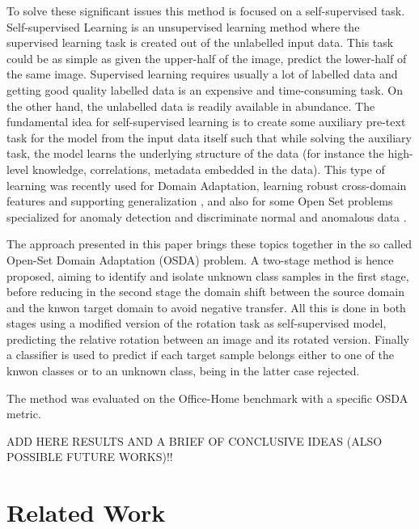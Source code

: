 \documentclass[10pt,twocolumn,letterpaper]{article}
\begin{document}
To solve these significant issues this method is focused on a self-supervised task. 
Self-supervised Learning is an unsupervised learning method where the supervised learning 
task is created out of the unlabelled input data. This task could be as simple as given 
the upper-half of the image, predict the lower-half of the same image.
Supervised learning requires usually a lot of labelled data and getting good quality labelled 
data is an expensive and time-consuming task. On the other hand, the unlabelled data is readily
available in abundance.
The fundamental idea for self-supervised learning is to create some auxiliary pre-text task
for the model from the input data itself such that while solving the auxiliary task,
the model learns the underlying structure of the data (for instance the high-level knowledge, correlations,
metadata embedded in the data).
This type of learning was recently used for Domain Adaptation, learning robust cross-domain features
and supporting generalization \cite{CarlucciJigsaw,SelfSupervisedXu}, and also for some Open Set problems specialized for anomaly detection
and discriminate normal and anomalous data \cite{bergman2020classificationbased,dectionGeometric}.

The approach presented in this paper brings these topics together in the so called Open-Set Domain 
Adaptation (OSDA) problem. A two-stage method is hence proposed, aiming to identify and isolate unknown
class samples in the first stage, before reducing in the second stage the domain shift between the source 
domain and the knwon target domain to avoid negative transfer.
All this is done in both stages using a modified version of the rotation task as self-supervised model,
predicting the relative rotation between an image and its rotated version.
Finally a classifier is used to predict if each target sample belongs either to one of the knwon classes
or to an unknown class, being in the latter case rejected.

The method was evaluated on the Office-Home benchmark \cite{venkateswara2017deep} with a specific OSDA metric.

ADD HERE RESULTS AND A BRIEF OF CONCLUSIVE IDEAS (ALSO POSSIBLE FUTURE WORKS)!!

\section{Related Work}
\label{sec:relatedwork}
\end{document}
